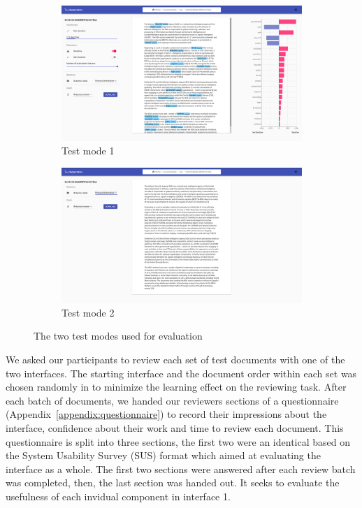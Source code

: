 \documentclass[\version]{l4proj}
\begin{document}
\begin{figure}[H]
    \centering
    \begin{subfigure}[c]{0.49\textwidth}
        \centering
        \includegraphics[width=\textwidth]{images/ui_test_mode_1.png}
        \caption{Test mode 1}\label{fig:test-mode-1}
    \end{subfigure}
    \begin{subfigure}[c]{0.49\textwidth}
        \centering
        \includegraphics[width=\textwidth]{images/ui_test_mode_2.png}
        \caption{Test mode 2}\label{fig:test-mode-2}
    \end{subfigure}
    \caption{The two test modes used for evaluation}\label{fig:test-modes}
\end{figure}

We asked our participants to review each set of test documents with one of the two interfaces.
The starting interface and the document order within each set was chosen randomly in to minimize the learning effect on the reviewing task.
After each batch of documents, we handed our reviewers sections of a questionnaire (Appendix~\ref{appendix:questionnaire}) to record their impressions about the interface, confidence about their work and time to review each document.
This questionnaire is split into three sections, the first two were an identical based on the System Usability Survey (SUS) format \autocite[Chap.~21]{jordanUsabilityEvaluationIndustry1996} which aimed at evaluating the interface as a whole.
The first two sections were answered after each review batch was completed, then, the last section was handed out.
It seeks to evaluate the usefulness of each invidual component in interface 1.
\end{document}
